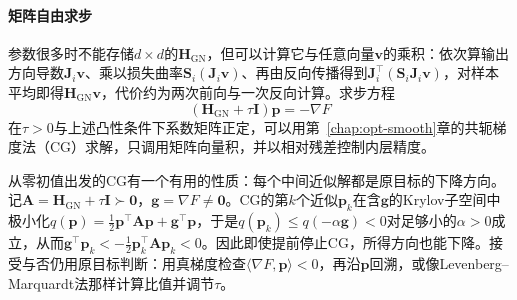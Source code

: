 \paragraph{矩阵自由求步}
参数很多时不能存储$d\times d$的$\bm H_{\mathrm{GN}}$，但可以计算它与任意向量$\bm v$的乘积：依次算输出方向导数$\bm J_i\bm v$、乘以损失曲率$\bm S_i(\bm J_i\bm v)$、再由反向传播得到$\bm J_i^\top(\bm S_i\bm J_i\bm v)$，对样本平均即得$\bm H_{\mathrm{GN}}\bm v$，代价约为两次前向与一次反向计算。求步方程
\[
  (\bm H_{\mathrm{GN}}+\tau\bm I)\bm p=-\nabla F
\]
在$\tau>0$与上述凸性条件下系数矩阵正定，可以用第~\ref{chap:opt-smooth}章的共轭梯度法（CG）求解，只调用矩阵向量积，并以相对残差控制内层精度。

从零初值出发的CG有一个有用的性质：每个中间近似解都是原目标的下降方向。记$\bm A=\bm H_{\mathrm{GN}}+\tau\bm I\succ\bm0$，$\bm g=\nabla F\ne\bm0$。CG的第$k$个近似$\bm p_k$在含$\bm g$的Krylov子空间中极小化$q(\bm p)=\tfrac12\bm p^\top\bm A\bm p+\bm g^\top\bm p$，于是$q(\bm p_k)\le q(-\alpha\bm g)<0$对足够小的$\alpha>0$成立，从而$\bm g^\top\bm p_k<-\tfrac12\bm p_k^\top\bm A\bm p_k<0$。因此即使提前停止CG，所得方向也能下降。接受与否仍用原目标判断：用真梯度检查$\langle\nabla F,\bm p\rangle<0$，再沿$\bm p$回溯，或像Levenberg--Marquardt法那样计算比值并调节$\tau$。

